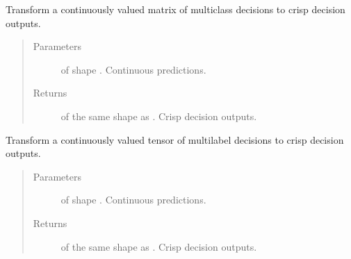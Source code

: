 \documentclass[letterpaper,10pt,english]{sphinxmanual}
\begin{document}
\begin{fulllineitems}
\label{\detokenize{pusion.util.transformer:pusion.util.transformer.multiclass_predictions_to_decisions}}
\sphinxAtStartPar
Transform a continuously valued matrix of multiclass decisions to crisp decision outputs.
\begin{quote}\begin{description}
\item[{Parameters}] \leavevmode
\sphinxAtStartPar
{} \textendash{}  of shape . Continuous predictions.

\item[{Returns}] \leavevmode
\sphinxAtStartPar
{} of the same shape as . Crisp decision outputs.

\end{description}\end{quote}

\end{fulllineitems}


\begin{fulllineitems}
\label{\detokenize{pusion.util.transformer:pusion.util.transformer.multilabel_prediction_tensor_to_decision_tensor}}
\sphinxAtStartPar
Transform a continuously valued tensor of multilabel decisions to crisp decision outputs.
\begin{quote}\begin{description}
\item[{Parameters}] \leavevmode
\sphinxAtStartPar
{} \textendash{}  of shape . Continuous predictions.

\item[{Returns}] \leavevmode
\sphinxAtStartPar
{} of the same shape as . Crisp decision outputs.

\end{description}\end{quote}

\end{fulllineitems}
\end{document}
